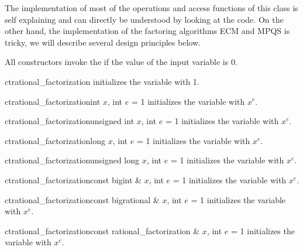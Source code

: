 \begin{techdoc}
  The implementation of most of the operations and access functions of this class is self
  explaining and can directly be understood by looking at the code.  On the other hand, the
  implementation of the factoring algorithms ECM and MPQS is tricky, we will describe several
  design principles below.
\end{techdoc}



\CONS

All constructors invoke the \LEH if the value of the input variable is 0.

\begin{fcode}{ct}{rational_factorization}{}
  initializes the variable with 1.
\end{fcode}

\begin{fcode}{ct}{rational_factorization}{int $x$, int $e$ = 1}
  initializes the variable with $x^e$.
\end{fcode}

\begin{fcode}{ct}{rational_factorization}{unsigned int $x$, int $e$ = 1}
  initializes the variable with $x^e$.
\end{fcode}

\begin{fcode}{ct}{rational_factorization}{long $x$, int $e$ = 1}
  initializes the variable with $x^e$.
\end{fcode}

\begin{fcode}{ct}{rational_factorization}{unsigned long $x$, int $e$ = 1}
  initializes the variable with $x^e$.
\end{fcode}

\begin{fcode}{ct}{rational_factorization}{const bigint & $x$, int $e$ = 1}
  initializes the variable with $x^e$.
\end{fcode}

\begin{fcode}{ct}{rational_factorization}{const bigrational & $x$, int $e$ = 1}
  initializes the variable with $x^e$.
\end{fcode}

\begin{fcode}{ct}{rational_factorization}{const rational_factorization & $x$, int $e$ = 1}
  initializes the variable with $x^e$.
\end{fcode}{}

